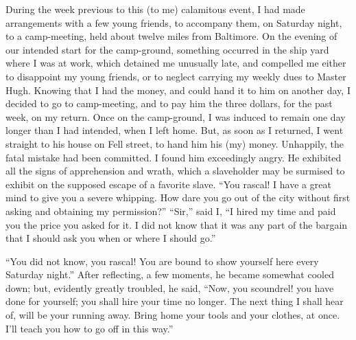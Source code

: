 During the week previous to this (to me) calamitous event, I had made
arrangements with a few young friends, to accompany them, on Saturday
night, to a camp-meeting, held about twelve miles from Baltimore. On the
evening of our intended start for the camp-ground, something occurred in
the ship yard where I was at work, which detained me unusually late, and
compelled me either to disappoint my young friends, or to neglect
carrying my weekly dues to Master Hugh. Knowing that I had the money,
and {}could hand it to him on another day, I decided to go to
camp-meeting, and to pay him the three dollars, for the past week, on my
return. Once on the camp-ground, I was induced to remain one day longer
than I had intended, when I left home. But, as soon as I returned, I
went straight to his house on Fell street, to hand him his (my) money.
Unhappily, the fatal mistake had been committed. I found him exceedingly
angry. He exhibited all the signs of apprehension and wrath, which a
slaveholder may be surmised to exhibit on the supposed escape of a
favorite slave. ``You rascal! I have a great mind to give you a severe
whipping. How dare you go out of the city without first asking and
obtaining my permission?'' ``Sir,'' said I, ``I hired my time and paid
you the price you asked for it. I did not know that it was any part of
the bargain that I should ask you when or where I should go.''

``You did not know, you rascal! You are bound to show yourself here
every Saturday night.'' After reflecting, a few moments, he became
somewhat cooled down; but, evidently greatly troubled, he said, ``Now,
you scoundrel! you have done for yourself; you shall hire your time no
longer. The next thing I shall hear of, will be your running away. Bring
home your tools and your clothes, at once. I'll teach you how to go off
in this way.''

